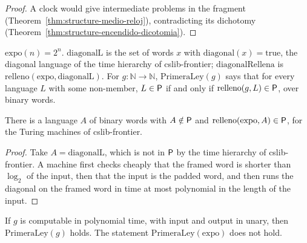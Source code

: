\begin{proof}
  \leanok
  A clock would give intermediate problems in the fragment (Theorem~\ref{thm:structure-medio-reloj}),
  contradicting its dichotomy (Theorem~\ref{thm:structure-encendido-dicotomia}).
\end{proof}

\begin{definition}
  \label{def:structure-relleno-exp}
  \leanok
  $\mathrm{expo}(n) = 2^n$. $\mathrm{diagonalL}$ is the set of words $x$ with $\mathrm{diagonal}(x) =
  \mathrm{true}$, the diagonal language of the time hierarchy of cslib-frontier;
  $\mathrm{diagonalRellena}$ is $\mathrm{relleno}(\mathrm{expo}, \mathrm{diagonalL})$. For $g : \mathbb{N}
  \to \mathbb{N}$, $\mathrm{PrimeraLey}(g)$ says that for every language $L$ with some non-member,
  $L \in \mathsf{P}$ if and only if $\mathrm{relleno}(g, L) \in \mathsf{P}$, over binary words.
  \own{}
\end{definition}

\begin{theorem}
  \label{thm:structure-dificil-relleno-facil}
  \leanok
  There is a language $A$ of binary words with $A \notin \mathsf{P}$ and $\mathrm{relleno}(\mathrm{expo}, A) \in
  \mathsf{P}$, for the Turing machines of cslib-frontier.
  \own{}
\end{theorem}

\begin{proof}
  \leanok
  Take $A = \mathrm{diagonalL}$, which is not in $\mathsf{P}$ by the time hierarchy of cslib-frontier. A machine
  first checks cheaply that the framed word is shorter than $\log_2$ of the input, then that the input
  is the padded word, and then runs the diagonal on the framed word in time at most polynomial in the
  length of the input.
\end{proof}

\begin{theorem}
  \label{thm:structure-primera-ley}
  \leanok
  If $g$ is computable in polynomial time, with input and output in unary, then $\mathrm{PrimeraLey}(g)$
  holds. The statement $\mathrm{PrimeraLey}(\mathrm{expo})$ does not hold.
  \own{}
\end{theorem}

